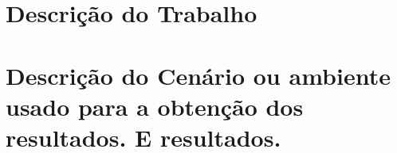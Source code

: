 \documentclass[a4paper]{book}
\begin{document}
%
%

\chapter{Descrição do Trabalho}

%

\chapter{Descrição do Cenário ou ambiente usado para a obtenção dos resultados. E resultados.}

%
%  
\end{document}
